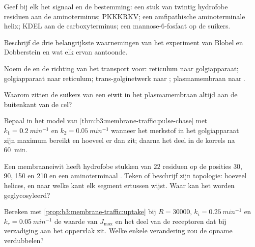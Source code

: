 \begin{exercise}[$\star$]\label{exo:b3:membrane-traffic:1}
Geef bij elk het signaal en de bestemming: een stuk van twintig
hydrofobe residuen aan de aminoterminus; PKKKRKV; een amfipathische
aminoterminale helix; KDEL aan de carboxyterminus; een
mannose-6-fosfaat op de suikers.
\end{exercise}

\begin{exercise}[$\star$]\label{exo:b3:membrane-traffic:2}
Beschrijf de drie belangrijkste waarnemingen van het experiment van
Blobel en Dobberstein en wat elk ervan aantoonde.
\end{exercise}

\begin{exercise}[$\star$]\label{exo:b3:membrane-traffic:3}
Noem de  en de richting van het transport voor: reticulum naar
golgiapparaat; golgiapparaat naar reticulum; trans-golginetwerk naar
; plasmamembraan naar .
\end{exercise}

\begin{exercise}[$\star$]\label{exo:b3:membrane-traffic:4}
Waarom zitten de suikers van een eiwit in het plasmamembraan altijd aan
de buitenkant van de cel?
\end{exercise}

\begin{exercise}[$\star\star$]\label{exo:b3:membrane-traffic:5}
Bepaal in het model van \cref{thm:b3:membrane-traffic:pulse-chase} met
$k_{1}
= \qty{0.2}{min^{-1}}$ en $k_{2} = \qty{0.05}{min^{-1}}$ wanneer het
merkstof in het golgiapparaat zijn maximum bereikt en hoeveel er dan
zit; daarna het deel in de korrels na \qty{60}{min}.
\end{exercise}

\begin{exercise}[$\star\star$]\label{exo:b3:membrane-traffic:6}
Een membraaneiwit heeft hydrofobe stukken van $22$ residuen op de
posities 30, 90, 150 en 210 en een aminoterminaal . Teken
of beschrijf zijn topologie: hoeveel helices, en naar welke kant elk
segment ertussen wijst. Waar kan het worden geglycosyleerd?
\end{exercise}

\begin{exercise}[$\star\star$]\label{exo:b3:membrane-traffic:7}
Bereken met \cref{prop:b3:membrane-traffic:uptake} bij $R = \num{30000}$,
$k_{i} = \qty{0.25}{min^{-1}}$ en $k_{r} = \qty{0.05}{min^{-1}}$ de
waarde van $J_{\max}$ en het deel van de receptoren dat bij verzadiging
aan het oppervlak zit. Welke enkele verandering zou de opname
verdubbelen?
\end{exercise}

